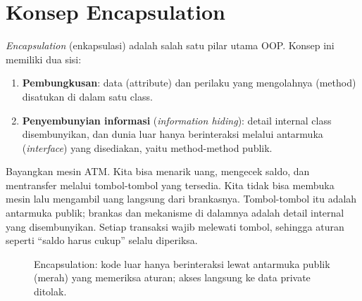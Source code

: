 \section{Konsep Encapsulation}

\emph{Encapsulation} (enkapsulasi) adalah salah satu pilar utama OOP. Konsep ini memiliki dua sisi:

\begin{enumerate}
  \item \textbf{Pembungkusan}: data (attribute) dan perilaku yang mengolahnya (method) disatukan di dalam satu class.
  \item \textbf{Penyembunyian informasi} (\emph{information hiding}): detail internal class disembunyikan, dan dunia luar hanya berinteraksi melalui antarmuka (\emph{interface}) yang disediakan, yaitu method-method publik.
\end{enumerate}

Bayangkan mesin ATM. Kita bisa menarik uang, mengecek saldo, dan mentransfer melalui tombol-tombol yang tersedia. Kita tidak bisa membuka mesin lalu mengambil uang langsung dari brankasnya. Tombol-tombol itu adalah antarmuka publik; brankas dan mekanisme di dalamnya adalah detail internal yang disembunyikan. Setiap transaksi wajib melewati tombol, sehingga aturan seperti ``saldo harus cukup'' selalu diperiksa.

\begin{figure}[htbp]
\centering
{}
\caption{Encapsulation: kode luar hanya berinteraksi lewat antarmuka publik (merah) yang memeriksa aturan; akses langsung ke data private ditolak.}
\end{figure}

